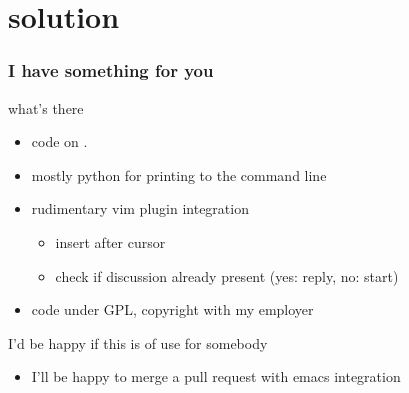 \section{solution}
\begin{frame}
  \frametitle{I have something for you}
  \begin{block}{what's there}
    \begin{itemize}
      \item code on .
      \item mostly python for printing to the command line
      \item rudimentary vim plugin integration
        \begin{itemize}
          \item insert after cursor
          \item check if discussion already present (yes: reply, no: start)
        \end{itemize}
      \item code under GPL, copyright with my employer
    \end{itemize}
  \end{block}
  \begin{exampleblock}{I'd be happy if this is of use for somebody}
    \begin{itemize}
      \item I'll be happy to merge a pull request with emacs integration
    \end{itemize}
  \end{exampleblock}
\end{frame}
